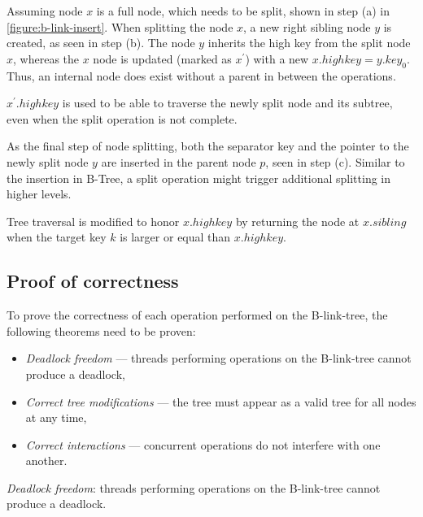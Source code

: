 Assuming node $x$ is a full node, which needs to be split, shown in step (a) in \cref{figure:b-link-insert}. When splitting the node $x$, a new right sibling node $y$ is created, as seen in step (b). The node $y$ inherits the high key from the split node $x$, whereas the $x$ node is updated (marked as $x^\prime$) with a new $x.highkey = y.key_0$. Thus, an internal node does exist without a parent in between the operations.

$x^\prime.highkey$ is used to be able to traverse the newly split node and its subtree, even when the split operation is not complete. 

As the final step of node splitting, both the separator key and the pointer to the newly split node $y$ are inserted in the parent node $p$, seen in step (c). Similar to the insertion in B-Tree, a split operation might trigger additional splitting in higher levels.

Tree traversal is modified to honor $x.highkey$ by returning the node at $x.\mathit{sibling}$ when the target key $k$ is larger or equal than $x.highkey$.

\subsection{Proof of correctness}

To prove the correctness of each operation performed on the B-link-tree, the following theorems need to be proven: 

\begin{itemize}
  \item \textit{Deadlock freedom} --- threads performing operations on the B-link-tree cannot produce a deadlock,
  \item \textit{Correct tree modifications} --- the tree must appear as a valid tree for all nodes at any time,
  \item \textit{Correct interactions} --- concurrent operations do not interfere with one another.
\end{itemize}

\begin{theorem}
  \textit{Deadlock freedom}: threads performing operations on the B-link-tree cannot produce a deadlock.
\end{theorem}


